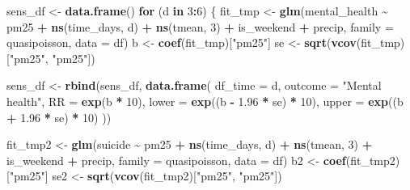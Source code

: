 \documentclass[
]{article}
\newenvironment{Shaded}{\begin{snugshade}}{\end{snugshade}}
\newcommand{\AttributeTok}[1]{\textcolor[rgb]{0.13,0.29,0.53}{#1}}
\newcommand{\ControlFlowTok}[1]{\textcolor[rgb]{0.13,0.29,0.53}{\textbf{#1}}}
\newcommand{\DecValTok}[1]{\textcolor[rgb]{0.00,0.00,0.81}{#1}}
\newcommand{\FloatTok}[1]{\textcolor[rgb]{0.00,0.00,0.81}{#1}}
\newcommand{\FunctionTok}[1]{\textcolor[rgb]{0.13,0.29,0.53}{\textbf{#1}}}
\newcommand{\NormalTok}[1]{#1}
\newcommand{\OtherTok}[1]{\textcolor[rgb]{0.56,0.35,0.01}{#1}}
\newcommand{\SpecialCharTok}[1]{\textcolor[rgb]{0.81,0.36,0.00}{\textbf{#1}}}
\newcommand{\StringTok}[1]{\textcolor[rgb]{0.31,0.60,0.02}{#1}}
\begin{document}
\begin{Shaded}
\begin{Highlighting}[]
\NormalTok{sens\_df }\OtherTok{\textless{}{-}} \FunctionTok{data.frame}\NormalTok{()}
\ControlFlowTok{for}\NormalTok{ (d }\ControlFlowTok{in} \DecValTok{3}\SpecialCharTok{:}\DecValTok{6}\NormalTok{) \{}
\NormalTok{  fit\_tmp }\OtherTok{\textless{}{-}} \FunctionTok{glm}\NormalTok{(mental\_health }\SpecialCharTok{\textasciitilde{}}\NormalTok{ pm25 }\SpecialCharTok{+} \FunctionTok{ns}\NormalTok{(time\_days, d) }\SpecialCharTok{+} \FunctionTok{ns}\NormalTok{(tmean, }\DecValTok{3}\NormalTok{) }\SpecialCharTok{+}
\NormalTok{                   is\_weekend }\SpecialCharTok{+}\NormalTok{ precip,}
                 \AttributeTok{family =}\NormalTok{ quasipoisson, }\AttributeTok{data =}\NormalTok{ df)}
\NormalTok{  b }\OtherTok{\textless{}{-}} \FunctionTok{coef}\NormalTok{(fit\_tmp)[}\StringTok{"pm25"}\NormalTok{]}
\NormalTok{  se }\OtherTok{\textless{}{-}} \FunctionTok{sqrt}\NormalTok{(}\FunctionTok{vcov}\NormalTok{(fit\_tmp)[}\StringTok{"pm25"}\NormalTok{, }\StringTok{"pm25"}\NormalTok{])}

\NormalTok{  sens\_df }\OtherTok{\textless{}{-}} \FunctionTok{rbind}\NormalTok{(sens\_df, }\FunctionTok{data.frame}\NormalTok{(}
    \AttributeTok{df\_time =}\NormalTok{ d,}
    \AttributeTok{outcome =} \StringTok{"Mental health"}\NormalTok{,}
    \AttributeTok{RR =} \FunctionTok{exp}\NormalTok{(b }\SpecialCharTok{*} \DecValTok{10}\NormalTok{),}
    \AttributeTok{lower =} \FunctionTok{exp}\NormalTok{((b }\SpecialCharTok{{-}} \FloatTok{1.96} \SpecialCharTok{*}\NormalTok{ se) }\SpecialCharTok{*} \DecValTok{10}\NormalTok{),}
    \AttributeTok{upper =} \FunctionTok{exp}\NormalTok{((b }\SpecialCharTok{+} \FloatTok{1.96} \SpecialCharTok{*}\NormalTok{ se) }\SpecialCharTok{*} \DecValTok{10}\NormalTok{)}
\NormalTok{  ))}

\NormalTok{  fit\_tmp2 }\OtherTok{\textless{}{-}} \FunctionTok{glm}\NormalTok{(suicide }\SpecialCharTok{\textasciitilde{}}\NormalTok{ pm25 }\SpecialCharTok{+} \FunctionTok{ns}\NormalTok{(time\_days, d) }\SpecialCharTok{+} \FunctionTok{ns}\NormalTok{(tmean, }\DecValTok{3}\NormalTok{) }\SpecialCharTok{+}
\NormalTok{                     is\_weekend }\SpecialCharTok{+}\NormalTok{ precip,}
                   \AttributeTok{family =}\NormalTok{ quasipoisson, }\AttributeTok{data =}\NormalTok{ df)}
\NormalTok{  b2 }\OtherTok{\textless{}{-}} \FunctionTok{coef}\NormalTok{(fit\_tmp2)[}\StringTok{"pm25"}\NormalTok{]}
\NormalTok{  se2 }\OtherTok{\textless{}{-}} \FunctionTok{sqrt}\NormalTok{(}\FunctionTok{vcov}\NormalTok{(fit\_tmp2)[}\StringTok{"pm25"}\NormalTok{, }\StringTok{"pm25"}\NormalTok{])}


\end{Highlighting}
\end{Shaded}
\end{document}
